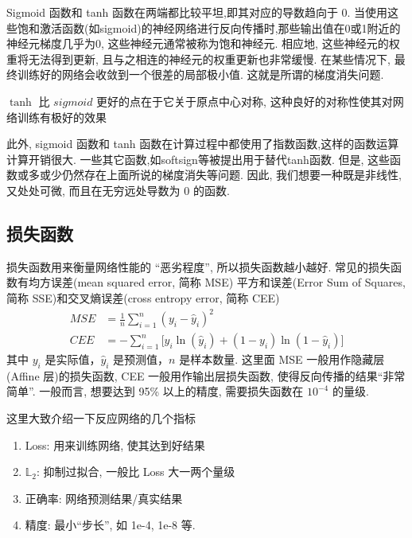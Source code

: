 Sigmoid 函数和 tanh 函数在两端都比较平坦,即其对应的导数趋向于 0. 当使用这些饱和激活函数(如sigmoid)的神经网络进行反向传播时,那些输出值在0或1附近的神经元梯度几乎为0, 这些神经元通常被称为饱和神经元. 相应地, 这些神经元的权重将无法得到更新, 且与之相连的神经元的权重更新也非常缓慢. 在某些情况下, 最终训练好的网络会收敛到一个很差的局部极小值. 这就是所谓的梯度消失问题.
\begin{remark}
    $ \tanh $ 比 $ sigmoid $ 更好的点在于它关于原点中心对称, 这种良好的对称性使其对网络训练有极好的效果
\end{remark}

此外, sigmoid 函数和 tanh 函数在计算过程中都使用了指数函数,这样的函数运算计算开销很大. 一些其它函数,如softsign等被提出用于替代tanh函数. 但是, 这些函数或多或少仍然存在上面所说的梯度消失等问题. 因此, 我们想要一种既是非线性, 又处处可微, 而且在无穷远处导数为 0 的函数.  

\subsection{损失函数}
损失函数用来衡量网络性能的 ``恶劣程度'', 所以损失函数越小越好. 常见的损失函数有均方误差(mean squared error, 简称 MSE) 平方和误差(Error Sum of Squares, 简称 SSE)和交叉熵误差(cross entropy error, 简称 CEE)
\begin{equation}
    \begin{aligned}
        MSE &= \frac{1}{n} \sum_{i=1}^{n} (y_i - \hat{y}_i)^2 \\
        CEE &= - \sum_{i=1}^{n} \big[ y_i \ln(\hat{y}_i) + (1 - y_i) \ln(1 - \hat{y}_i) \big]
    \end{aligned}
\end{equation}
其中 $ y_i $ 是实际值，$ \hat{y}_i $ 是预测值，$ n $ 是样本数量. 
这里面 MSE 一般用作隐藏层(Affine 层)的损失函数, CEE 一般用作输出层损失函数, 使得反向传播的结果``非常简单''. 
一般而言, 想要达到 95\% 以上的精度, 需要损失函数在 $ 10^{-4} $ 的量级. 

\begin{remark}
    这里大致介绍一下反应网络的几个指标 
    \begin{enumerate}
        \item Loss: 用来训练网络, 使其达到好结果
        \item $ \mathbb{L}_{2} $: 抑制过拟合, 一般比 Loss 大一两个量级
        \item 正确率: 网络预测结果/真实结果
        \item 精度: 最小``步长'', 如 1e-4, 1e-8 等.
    \end{enumerate}
\end{remark}
